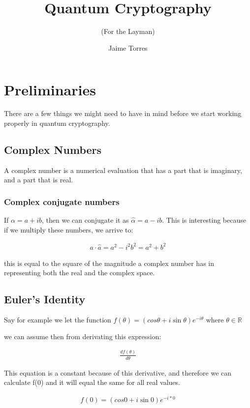 \documentclass{textbook}
\title     {Quantum Cryptography}
\subtitle  {(For the Layman)}
\author    {Jaime Torres}
\begin{document}
\tableofcontents

\chapter{Preliminaries}

There are a few things we might need to have in mind before we start working properly in quantum cryptography.

\section{Complex Numbers}

A complex number is a numerical evaluation that has a part that is imaginary, and a part that is real.

\subsection{Complex conjugate numbers}

If $\alpha = a + ib$, then we can conjugate it as $\hat{\alpha} = a - ib$. This is interesting because if we multiply these
numbers, we arrive to:

\begin{gather}
    a \cdot \hat{a} = a^2 - i^2 b^2 = a^2 + b^2
\end{gather}

this is equal to the square of the magnitude a complex number has in representing both the real and the complex space.

\section{Euler's Identity}

Say for example we let the function $f(\theta) = ( cos{\theta} + i \sin{\theta} ) e^{-i\theta}$
where $\theta \in \mathbb{R}$

we can assume then from derivating this expression:

\begin{gather}
    \frac{df(\theta)}{d\theta}
\end{gather}

This equation is a constant because of this derivative,
and therefore we can calculate f(0) and it will equal the same for all real values.

\begin{gather}
    f(0) = ( cos{0} + i \sin{0} ) e^{-i * 0}
\end{gather}
\end{document}
